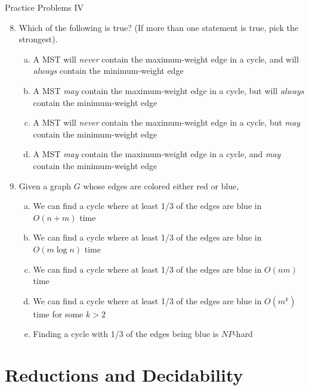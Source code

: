 \documentclass{beamer}
\begin{document}
\begin{frame}[t]{Practice Problems IV}
    \begin{enumerate}
        \setcounter{enumi}{7}
        \item Which of the following is true? (If more than one statement is true, pick the strongest).
            \begin{enumerate}[(a)]
                \item A MST will \textit{never} contain the maximum-weight edge in a cycle, and will \textit{always} contain the minimum-weight edge
                \item A MST \textit{may} contain the maximum-weight edge in a cycle, but will \textit{always} contain the minimum-weight edge
                \item A MST will \textit{never} contain the maximum-weight edge in a cycle, but \textit{may} contain the minimum-weight edge
                \item A MST \textit{may} contain the maximum-weight edge in a cycle, and \textit{may} contain the minimum-weight edge
            \end{enumerate}
        \item Given a graph $G$ whose edges are colored either red or blue,
            \begin{enumerate}[(a)]
                \item We can find a cycle where at least 1/3 of the edges are blue in $O(n + m)$ time
                \item We can find a cycle where at least 1/3 of the edges are blue in $O(m \log n)$ time
                \item We can find a cycle where at least 1/3 of the edges are blue in $O(nm)$ time
                \item We can find a cycle where at least 1/3 of the edges are blue in $O(m^k)$ time for some $k > 2$
                \item Finding a cycle with 1/3 of the edges being blue is $NP$-hard
            \end{enumerate}
    \end{enumerate}
\end{frame}

\section{Reductions and Decidability}
\end{document}
